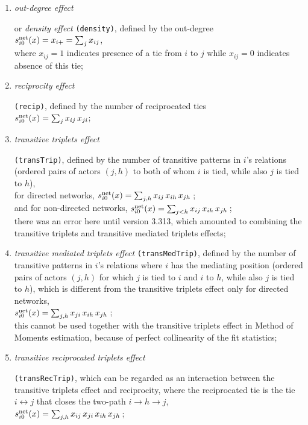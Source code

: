 \documentclass[a4paper,fleqn,11pt]{article}
\newcommand{\+}{\, + \,}
\newcommand{\vit}{\theenumi}
\begin{document}
\begin{enumerate}
 \item  \hypertarget{T_density}{{\em out-degree effect}} or
 \emph{density effect} \texttt{(density)},
 defined by the out-degree\\
 $s^{\rm net}_{i\vit}(x) = x_{i+} = \sum_j x_{ij}$,\\
 where $x_{ij}=1$ indicates presence of a tie from $i$ to $j$
 while $x_{ij}=0$ indicates absence of this tie;

 \item  \hypertarget{T_reci}{{\em reciprocity effect}} \texttt{(recip)},
 defined by the number of reciprocated ties\\
 $s^{\rm net}_{i\vit}(x) = \sum_j x_{ij}\,x_{ji}$;

 \item \hypertarget{T_transtrip}{{\em transitive triplets effect}}
 \texttt{(transTrip)},
   defined by the number of transitive
 patterns in $i$'s relations (ordered pairs of actors
 $(j,h)$ to both of whom $i$ is tied, while also $j$ is tied to $h$),\\
 for directed networks,
  $s^{\rm net}_{i\vit}(x) =  \sum_{j, h} x_{ij}\, x_{ih}\, x_{jh}\,$;\\
 and for non-directed networks,
 $s^{\rm net}_{i\vit}(x) =  \sum_{j < h} x_{ij}\, x_{ih}\, x_{jh}\,$;\\
 there was an error here until version 3.313,
 which amounted to combining the transitive triplets and transitive
 mediated triplets effects;

 \item {\em transitive mediated triplets effect} \texttt{(transMedTrip)},
 defined by the number of transitive patterns in $i$'s
 relations where $i$ has the mediating position
 (ordered pairs of actors
 $(j,h)$ for which $j$ is tied to $i$ and $i$ to $h$, while also $j$ is tied
 to $h$),  which is different from the transitive triplets effect
 only for directed networks,\\
  $s^{\rm net}_{i\vit}(x) =  \sum_{j, h} x_{ji}\, x_{ih}\, x_{jh}\,$;\\
 this cannot be used together with the transitive triplets effect in
 Method of Moments estimation, because of perfect collinearity
 of the fit statistics;


 \item \hypertarget{T_transtrip}
 {{\em transitive reciprocated triplets effect}}  \texttt{(transRecTrip)},
 which can be regarded as an interaction between the transitive triplets
 effect and reciprocity, where the reciprocated tie is the tie
 $i \leftrightarrow j$  that  closes the two-path
 $i \rightarrow h \rightarrow j$,\\
  $s^{\rm net}_{i\vit}(x) =  \sum_{j, h} x_{ij}\, x_{ji}\, x_{ih}\, x_{jh}\,$;


\end{enumerate}
\end{document}
